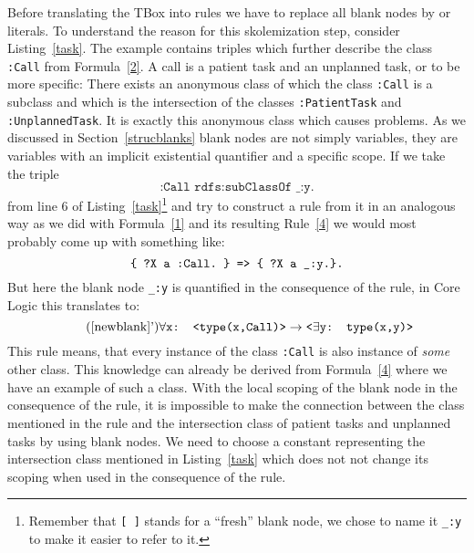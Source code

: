 Before translating the TBox into rules we have to replace all blank nodes by \uris or literals. To understand the reason for this skolemization step, 
consider Listing~\ref{task}.
The example contains triples which further describe the class \texttt{:Call} from Formula~\ref{2}.
A call is a patient task and an unplanned task, or to be more specific:
There exists an anonymous class of which the class \texttt{:Call} is a subclass and which is the intersection of 
the classes \texttt{:PatientTask} and \texttt{:UnplannedTask}. 
It is exactly this anonymous class which causes problems. As we discussed in Section~\ref{strucblanks}
blank nodes are not simply variables, they are variables with an implicit existential quantifier and a specific scope. 
If we take the triple
\begin{equation}
 \texttt{:Call rdfs:subClassOf \_:y.}
\end{equation}
from line 6 of Listing~\ref{task}\footnote{Remember that \texttt{[ ]} stands for a ``fresh'' blank node, we chose to name it \texttt{\_:y} to make it easier to refer to it.}
and try to construct a rule from it in an analogous way as we did with Formula~\ref{1} and its resulting Rule~\ref{4} we would most probably come up with something like: 
\begin{equation}
\verb!{ ?X a :Call. } => { ?X a _:y.}.! 
\label{newblank}
\end{equation}
But here the blank node \texttt{\_:y} is quantified in the consequence of the rule, in \nthree Core Logic this translates to:
\begin{equation}\tag{\ref{newblank}'}
 \forall\texttt{x: <type(x,Call)>}\rightarrow \texttt{<}\exists\texttt{y: type(x,y)>}
\end{equation}
This rule means, that every instance of the class \texttt{:Call} is also instance of \textit{some} other class. 
This knowledge can already be derived from Formula~\ref{4} where we have an example of such a class. 
% 
With the local scoping of the blank node in the consequence of the rule, it is impossible to make the connection  between the class mentioned in the rule and the  
intersection class of patient tasks and unplanned tasks by using blank nodes. We need to choose a constant representing the intersection class mentioned in Listing~\ref{task} 
which does not not change its scoping when used in the consequence of the rule. 

